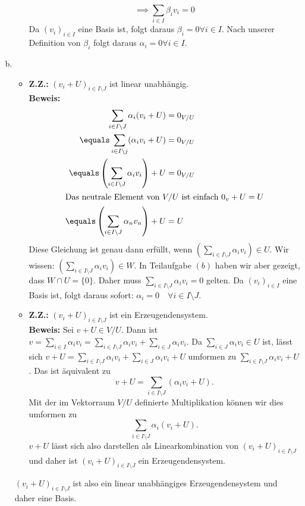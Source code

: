 \documentclass{article}
\begin{document}
\begin{enumerate}[(a)]
\begin{itemize}
				\[\implies \sum_{i\in I} \beta_iv_i = 0\]
				Da $(v_i)_{i\in I}$ eine Basis ist, folgt daraus $\beta_i = 0\forall i\in I$. 
				Nach unserer Definition von $\beta_i$ folgt daraus $\alpha_i = 0\forall i\in I$. 
		\end{itemize}
		\item 
		\begin{itemize}
			\item \textbf{Z.Z.:} $(v_i + U)_{i\in I\setminus J}$ ist linear unabhängig.\\
				\textbf{Beweis:} 
				\begin{align*}
					\sum_{i\in I\setminus J} \alpha_i(v_i + U) &= 0_{V/U}\\
					\equals \sum_{i\in I\setminus j} (\alpha_iv_i + U) &= 0_{V/U}\\
					\equals \left(\sum_{i\in I\setminus J} \alpha_iv_i\right) + U &= 0_{V/U}\\
					\intertext{Das neutrale Element von $V/U$ ist einfach $0_v + U = U$}
					\equals \left(\sum_{i\in I\setminus J} \alpha_nv_n\right) + U &= U
				\end{align*}
				Diese Gleichung ist genau dann erfüllt, wenn $\left(\sum_{i\in I\setminus J} \alpha_iv_i\right)\in U$.
				Wir wissen: $\left(\sum_{i\in I\setminus J} \alpha_iv_i\right) \in W$. In Teilaufgabe $(b)$ haben wir aber gezeigt, dass $W\cap U= \{0\}$. Daher muss $\sum_{i\in I\setminus J} \alpha_iv_i = 0$ gelten. Da $(v_i)_{i\in I}$ eine Basis ist, folgt daraus sofort: $\alpha_i = 0\quad \forall i\in I\setminus J$.
			\item \textbf{Z.Z.:} $(v_i + U)_{i\in I\setminus J}$ ist ein Erzeugendensystem.\\
			\textbf{Beweis:}
			Sei $v + U \in V/U$. Dann ist $v = \sum_{i\in I}\alpha_iv_i = \sum_{i\in I\setminus J}\alpha_iv_i + \sum_{i\in J} \alpha_iv_i$.
			Da $\sum_{i\in J} \alpha_iv_i \in U$ ist, lässt sich $v + U = \sum_{i\in I\setminus J}\alpha_iv_i + \sum_{i\in J} \alpha_iv_i + U$ umformen zu $\sum_{i\in I\setminus J} \alpha_iv_i + U$. Das ist äquivalent zu
			$$v + U = \sum_{i\in I\setminus J}\left(\alpha_iv_i + U\right).$$ Mit der im Vektorraum $V/U$ definierte Multiplikation können wir dies umformen zu 
			$$\sum_{i\in I\setminus J} \alpha_i(v_i + U).$$
			$v + U$ lässt sich also darstellen als Linearkombination von $(v_i + U)_{i\in I\setminus J}$ und daher ist $(v_i + U)_{i\in I\setminus J}$ ein Erzeugendensystem.
		\end{itemize}
	$(v_i + U)_{i\in I\setminus J}$ ist also ein linear unabhängiges Erzeugendensystem und daher eine Basis.
	\end{enumerate}
\end{document}
